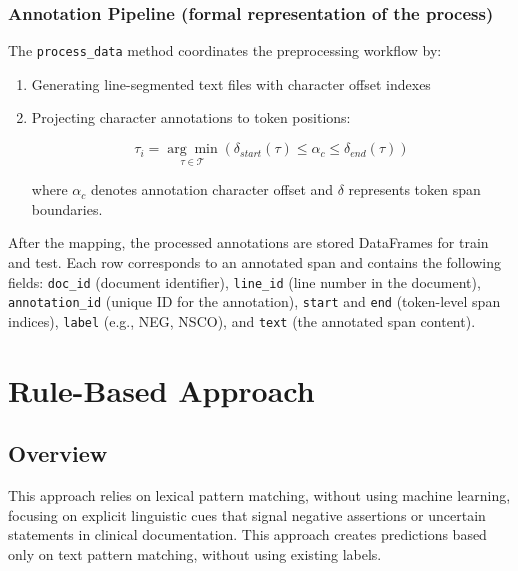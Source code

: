 \documentclass[9pt,a4paper,twoside]{tau-class/tau}
\begin{document}
        \begin{tcolorbox}[colback=blue!20, colframe=blue!20, sharp corners, boxrule=0.5pt]
        \subsubsection*{Annotation Pipeline (formal representation of the process)}
        The \lstinline|process_data| method coordinates the preprocessing workflow by:
        \begin{enumerate}
        \item Generating line-segmented text files with character offset indexes
        \item Projecting character annotations to token positions:
        
        \begin{equation}
            \tau_i = \underset{\tau \in \mathcal{T}}{\arg\min} \left( \delta_{start}(\tau) \leq \alpha_c \leq \delta_{end}(\tau) \right)
        \end{equation}
        
        where $\alpha_c$ denotes annotation character offset and $\delta$ represents token span boundaries.
        \end{enumerate}
        \end{tcolorbox}
        
        After the mapping, the processed annotations are stored DataFrames for train and test. Each row corresponds to an annotated span and contains the following fields: \texttt{doc\_id} (document identifier), \texttt{line\_id} (line number in the document), \texttt{annotation\_id} (unique ID for the annotation), \texttt{start} and \texttt{end} (token-level span indices), \texttt{label} (e.g., NEG, NSCO), and \texttt{text} (the annotated span content).
    
\section{Rule-Based Approach} \label{sec:rule-based}

    \subsection{Overview}
        This approach relies on lexical pattern matching, without using machine learning, focusing on explicit linguistic cues that signal negative assertions or uncertain statements in clinical documentation. This approach creates predictions based only on text pattern matching, without using existing labels.
\end{document}
